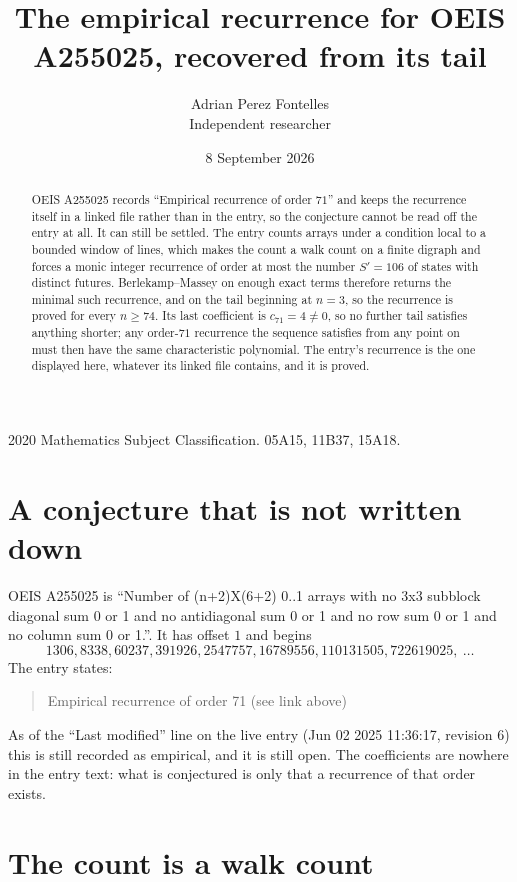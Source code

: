 \documentclass[11pt,a4paper]{article}
\title{The empirical recurrence for OEIS A255025, recovered from its tail}
\author{Adrian Perez Fontelles\\ \small Independent researcher}
\date{8 September 2026}
\theoremstyle{plain}
\theoremstyle{definition}
\begin{document}
\maketitle

\begin{abstract}
OEIS A255025 records ``Empirical recurrence of order $71$'' and keeps the recurrence itself in
a linked file rather than in the entry, so the conjecture cannot be read off the entry at all.
It can still be settled. The entry counts arrays under a condition local to a bounded window of
lines, which makes the count a walk count on a finite digraph and forces a monic integer
recurrence of order at most the number $S'=106$ of states with distinct futures. Berlekamp--Massey on
enough exact terms therefore returns the minimal such recurrence, and on the tail beginning at $n=3$, so the recurrence is proved for every $n\ge74$.
Its last coefficient is $c_{71}=4\neq0$, so no further tail satisfies anything
shorter; any order-$71$ recurrence the sequence satisfies from any point on must then have
the same characteristic polynomial. The entry's recurrence is the one displayed here, whatever
its linked file contains, and it is proved.
\end{abstract}

\noindent\small 2020 Mathematics Subject Classification. 05A15, 11B37, 15A18.\normalsize

\section{A conjecture that is not written down}

OEIS A255025 is ``Number of (n+2)X(6+2) 0..1 arrays with no 3x3 subblock diagonal sum 0 or 1 and no antidiagonal sum 0 or 1 and no row sum 0 or 1 and no column sum 0 or 1.''. It has offset $1$ and begins
\[
1306, 8338, 60237, 391926, 2547757, 16789556, 110131505, 722619025,\ \dots
\]
The entry states:
\begin{quote}
Empirical recurrence of order 71 (see link above)
\end{quote}
As of the ``Last modified'' line on the live entry (Jun 02 2025 11:36:17, revision 6)
this is still recorded as empirical, and it is still open. The coefficients are nowhere in the
entry text: what is conjectured is only that a recurrence of that order exists.

\section{The count is a walk count}
\end{document}
